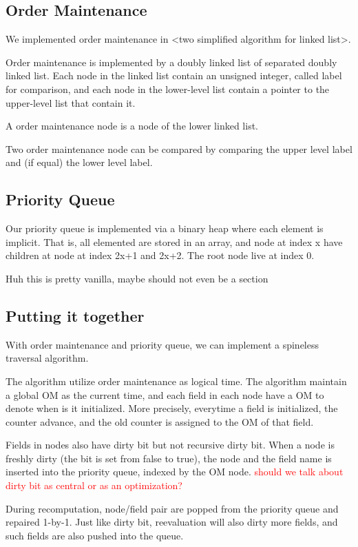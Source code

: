 \documentclass[format=acmsmall, review=false, screen=true]{acmart}
\newcommand\todo[1]{\textcolor{red}{#1}}
\begin{document}
\subsection{Order Maintenance}
We implemented order maintenance in <two simplified algorithm for linked list>.

Order maintenance is implemented by a doubly linked list of separated doubly linked list. Each node in the linked list contain an unsigned integer, called label for comparison, and each node in the lower-level list contain a pointer to the upper-level list that contain it.

A order maintenance node is a node of the lower linked list.

Two order maintenance node can be compared by comparing the upper level label and (if equal) the lower level label.

\subsection{Priority Queue}
Our priority queue is implemented via a binary heap where each element is implicit. That is, all elemented are stored in an array, and node at index x have children at node at index 2x+1 and 2x+2. The root node live at index 0.

Huh this is pretty vanilla, maybe should not even be a section
\subsection{Putting it together}
With order maintenance and priority queue, we can implement a spineless traversal algorithm.

The algorithm utilize order maintenance as logical time. The algorithm maintain a global OM as the current time, and each field in each node have a OM to denote when is it initialized. More precisely, everytime a field is initialized, the counter advance, and the old counter is assigned to the OM of that field.

Fields in nodes also have dirty bit but not recursive dirty bit. When a node is freshly dirty (the bit is set from false to true), the node and the field name is inserted into the priority queue, indexed by the OM node. \todo{should we talk about dirty bit as central or as an optimization?}

During recomputation, node/field pair are popped from the priority queue and repaired 1-by-1. Just like dirty bit, reevaluation will also dirty more fields, and such fields are also pushed into the queue.
\end{document}
